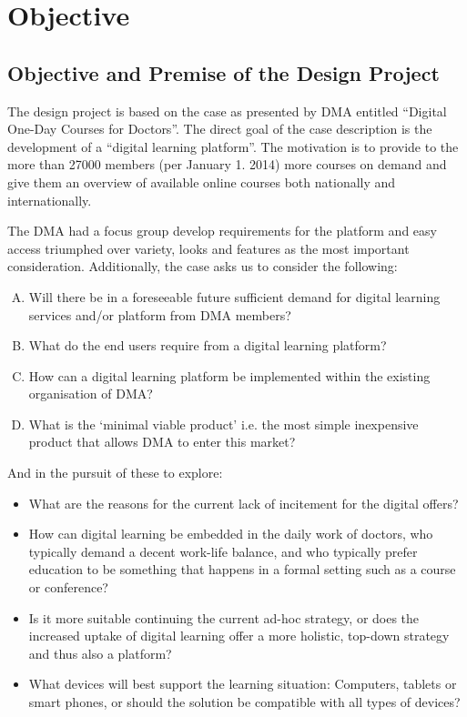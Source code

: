 \section{Objective}
\label{sec:objective}
\subsection{Objective and Premise of the Design Project }
The design project is based on the case as presented by DMA entitled “Digital One-Day Courses for Doctors”. The direct goal of the case description is the development of a “digital learning platform”. The motivation is to provide to the more than 27000 members (per January 1. 2014) more courses on demand and give them an overview of available online courses both nationally and internationally.

The DMA had a focus group develop requirements for the platform and easy access triumphed over variety, looks and features as the most important consideration. Additionally, the case asks us to consider the following:

\begin{enumerate}[A.]
\item Will there be in a foreseeable future sufficient demand for digital learning services and/or platform from DMA members?
\item What do the end users require from a digital learning platform?
\item How can a digital learning platform be implemented within the existing organisation of DMA?
\item What is the ‘minimal viable product’ i.e. the most simple inexpensive product that allows DMA to enter this market?
\end{enumerate}

And in the pursuit of these to explore:

\begin{itemize}
\item What are the reasons for the current lack of incitement for the digital offers?
\item How can digital learning  be embedded in the daily work of doctors, who typically demand a decent work-life balance, and who typically prefer education to be something that happens in a formal setting such as a course or conference?
\item Is it more suitable continuing the current ad-hoc strategy, or does the increased uptake of digital learning offer a more holistic, top-down strategy and thus also a platform?
\item What devices will best support the learning situation: Computers, tablets or smart phones, or should the solution be compatible with all types of devices?
\end{itemize}

